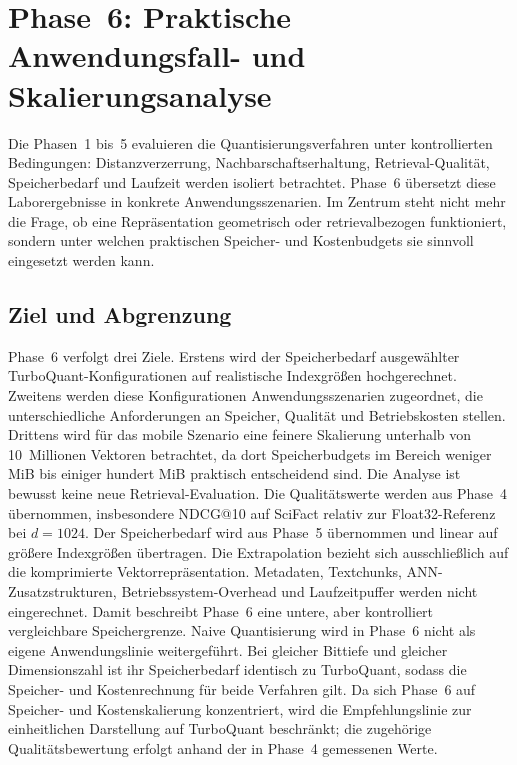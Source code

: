\section{Phase~6: Praktische Anwendungsfall- und Skalierungsanalyse}
\label{sec:methodik_phase6}
%
Die Phasen~1 bis~5 evaluieren die Quantisierungsverfahren unter kontrollierten Bedingungen: Distanzverzerrung, Nachbarschaftserhaltung, Retrieval-Qualität, Speicherbedarf und Laufzeit werden isoliert betrachtet.
Phase~6 übersetzt diese Laborergebnisse in konkrete Anwendungsszenarien.
Im Zentrum steht nicht mehr die Frage, ob eine Repräsentation geometrisch oder retrievalbezogen funktioniert, sondern unter welchen praktischen Speicher- und Kostenbudgets sie sinnvoll eingesetzt werden kann.
%
\subsection{Ziel und Abgrenzung}
%
Phase~6 verfolgt drei Ziele.
Erstens wird der Speicherbedarf ausgewählter TurboQuant-Konfigurationen auf realistische Indexgrößen hochgerechnet.
Zweitens werden diese Konfigurationen Anwendungsszenarien zugeordnet, die unterschiedliche Anforderungen an Speicher, Qualität und Betriebskosten stellen.
Drittens wird für das mobile Szenario eine feinere Skalierung unterhalb von 10~Millionen Vektoren betrachtet, da dort Speicherbudgets im Bereich weniger MiB bis einiger hundert MiB praktisch entscheidend sind.
%
Die Analyse ist bewusst keine neue Retrieval-Evaluation.
Die Qualitätswerte werden aus Phase~4 übernommen, insbesondere NDCG@10 auf SciFact relativ zur Float32-Referenz bei $d = 1024$.
Der Speicherbedarf wird aus Phase~5 übernommen und linear auf größere Indexgrößen übertragen.
Die Extrapolation bezieht sich ausschließlich auf die komprimierte Vektorrepräsentation.
Metadaten, Textchunks, ANN-Zusatzstrukturen, Betriebssystem-Overhead und Laufzeitpuffer werden nicht eingerechnet.
Damit beschreibt Phase~6 eine untere, aber kontrolliert vergleichbare Speichergrenze.
%
Naive Quantisierung wird in Phase~6 nicht als eigene Anwendungslinie weitergeführt.
Bei gleicher Bittiefe und gleicher Dimensionszahl ist ihr Speicherbedarf identisch zu TurboQuant, sodass die Speicher- und Kostenrechnung für beide Verfahren gilt.
Da sich Phase~6 auf Speicher- und Kostenskalierung konzentriert, wird die Empfehlungslinie zur einheitlichen Darstellung auf TurboQuant beschränkt; die zugehörige Qualitätsbewertung erfolgt anhand der in Phase~4 gemessenen Werte.
%

